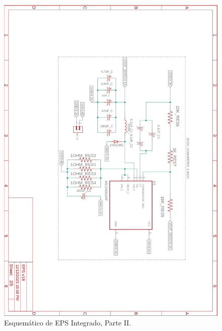 \begin{figure}[h]
  \centering
  \includegraphics[width=\textwidth]{Pictures/EPS_Sheets_page-0002.jpg}
  \caption{Esquemático de EPS Integrado, Parte II.}
  \label{fig:EPS_Sheet2}
\end{figure}
\newpage
